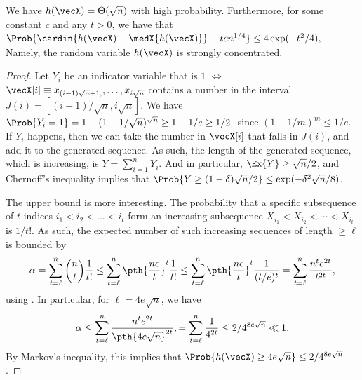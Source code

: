 \begin{lemma}
    We have $h(\vecX) =\Theta(\sqrt{n})$ with high
    probability. Furthermore, for some constant $c$ and any $t > 0$,
    we have that
    \begin{math} 
        \Prob{\bigl. \cardin{ h(\vecX) - \medX{h(\vecX)}} - t
           cn^{1/4}} \leq%
        4 \exp(-t^2/4),
    \end{math}
    Namely, the random variable $h(\vecX)$ is strongly concentrated.
\end{lemma}
\begin{proof}
    Let $Y_i$ be an indicator variable that is $1$ $\iff$
    $\vecX[i] \equiv x_{(i-1)\sqrt{n}+ 1,}, \ldots, x_{i\sqrt{n}}$
    contains a number in the interval
    $J(i) = [(i-1)/\sqrt{n}, i\sqrt{n}]$. We have
    \begin{math}
        \Prob{Y_i=1}%
        =%
        1 - (1-1/\sqrt{n})^{\sqrt{n}} \geq 1-1/e \geq 1/2,
    \end{math}
    since $(1-1/m)^m \leq 1/e$. If $Y_i$ happens, then we can take the
    number in $\vecX[i]$ that falls in $J(i)$, and add it to the
    generated sequence. As such, the length of the generated sequence,
    which is increasing, is $Y=\sum_{i=1}^n Y_i$. And in particular,
    $\Ex{Y} \geq \sqrt{n}/2$, and Chernoff's inequality implies that
    $\Prob{Y \geq (1-\delta)\sqrt{n}/2} \leq \exp( - \delta^2
    \sqrt{n}/8 )$.

    The upper bound is more interesting. The probability that a
    specific subsequence of $t$ indices $i_1 < i_2 < \ldots <i_t$ form
    an increasing subsequence $X_{i_1} < X_{i_2} < \cdots < X_{i_t}$
    is $1/t!$. As such, the expected number of such increasing
    sequences of length $\geq \ell$ is bounded by
    \begin{equation*}
        \alpha %
        =%
        \sum_{t=\ell}^n \binom{n}{t} \frac{1}{t!}%
        \leq%
        \sum_{t=\ell}^n \pth{\frac{n e}{t}}^t \frac{1}{t!}
        \leq%
        \sum_{t=\ell}^n \pth{\frac{n e}{t}}^t \frac{1}{(t/e)^t}
        = %
        \sum_{t=\ell}^n \frac{n^t e^{2t}}{t^{2t}},
    \end{equation*}
    using . In particular, for $\ell =
    4e \sqrt{n}$, we have
    \begin{equation*}
        \alpha %
        \leq %
        \sum_{t=\ell}^n \frac{n^t e^{2t}}{\pth{4 e \sqrt{n}}^{2t}},
        =%
        \sum_{t=\ell}^n \frac{1}{4^{2t}}%
        \leq%
        2 / 4^{8e\sqrt{n}}%
        \ll%
        1.%
    \end{equation*}
    By Markov's inequality, this implies that
    $\Prob{h(\vecX) \geq 4e \sqrt{n}} \leq 2 / 4^{8e\sqrt{n}}$. %


\end{proof}
